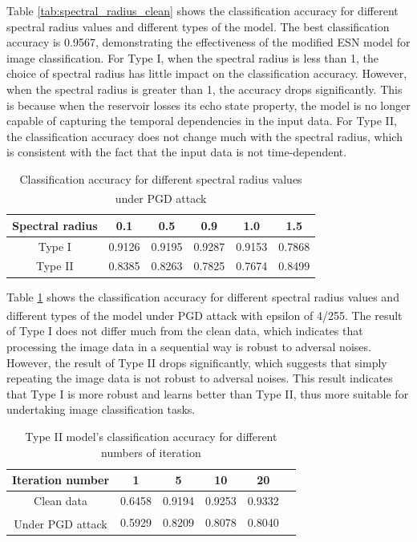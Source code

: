 \documentclass{article}
\newcommand{\upcite}[1]{\textsuperscript{\cite{#1}}} %
\begin{document}
Table \ref{tab:spectral_radius_clean} shows the classification accuracy for different spectral radius values
and different types of the model. The best classification accuracy is 0.9567, demonstrating the effectiveness
of the modified ESN model for image classification. For Type I, when the spectral radius is less than 1, the
choice of spectral radius has little impact on the classification accuracy. However, when the spectral radius
is greater than 1, the accuracy drops significantly. This is because when the reservoir losses its echo state property,
the model is no longer capable of capturing the temporal dependencies in the input data. For Type II, the classification
accuracy does not change much with the spectral radius, which is consistent with the fact that the input data is not
time-dependent.


\begin{table}[htbp]
    \centering
    \caption{Classification accuracy for different spectral radius values under PGD\upcite{PGD} attack}
    \begin{tabular}{c|ccccc}
        \hline
        Spectral radius & 0.1   & 0.5   & 0.9   & 1.0   & 1.5   \\ \hline
        Type I          & 0.9126 & 0.9195 & 0.9287 & 0.9153 & 0.7868 \\
        Type II         & 0.8385 & 0.8263 & 0.7825 & 0.7674 & 0.8499 \\ \hline
    \end{tabular}
    \label{tab:spectral_radius_adversal}
\end{table}


Table \ref{tab:spectral_radius_adversal} shows the classification accuracy for different spectral radius values
and different types of the model under PGD\upcite{PGD} attack with epsilon of 4/255. The result of Type I does not
differ much from the clean data, which indicates that processing the image data in a sequential way is robust to 
adversal noises. However, the result of Type II drops significantly, which suggests that simply repeating the image data
is not robust to adversal noises. This result indicates that Type I is more robust and learns better than Type II, thus 
more suitable for undertaking image classification tasks.


\begin{table}[htbp]
    \centering
    \caption{Type II model's classification accuracy for different numbers of iteration }
    \begin{tabular}{c|ccccc}
        \hline
        Iteration number& 1   & 5   & 10   & 20             \\ \hline
        Clean data      & 0.6458 & 0.9194 & 0.9253 & 0.9332 \\ 
        Under PGD\upcite{PGD} attack& 0.5929 & 0.8209 & 0.8078 & 0.8040 \\ \hline
    \end{tabular}
    \label{tab:num_iters}
\end{table}
\end{document}
